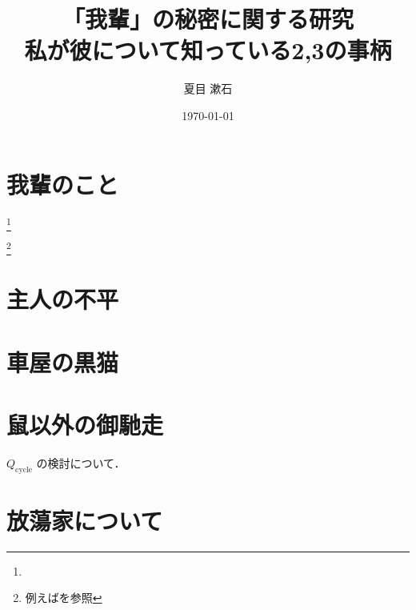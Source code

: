 \documentclass[10pt,oneside,fleqn]{scrartcl}
\author{夏目 漱石}
\date{\today}
\title{「我輩」の秘密に関する研究\\\medskip
\large 私が彼について知っている2,3の事柄}
\begin{document}
\maketitle

\section{我輩のこと}
\label{sec:org17b614a}
 \footnote{}

 \footnote{例えば\cite{吉田2006,竹内1963,杉浦1980,杉浦1985,田中2006}を参照}

\section{主人の不平}
\label{sec:orgae60009}

\begin{figure}[htbp] %
  \centering
  \myGraph[1]{} %
\end{figure}

\section{車屋の黒猫}
\label{sec:orgafbc8b3}

\begin{figure*} %
  \centering
\end{figure*}

\section{鼠以外の御馳走}
\label{sec:org35c2a12}
\begin{marginfigure}
  \centering
  \myGraph*{} %
  \caption{$Q_{\mathrm{cycle}}$ の検討について．
    \label{fig:4}}
\end{marginfigure}

\section{放蕩家について}
\label{sec:org072125a}

\begin{otherlanguage}{english}
  \printbibliography[title=参考文献]
\end{otherlanguage}
\end{document}
